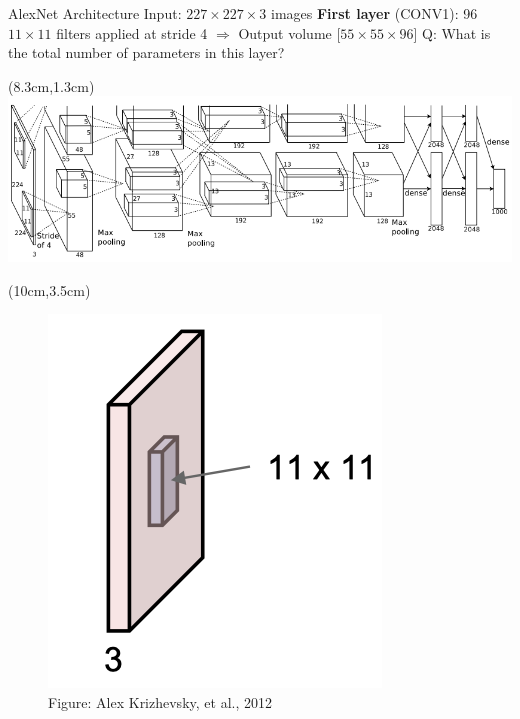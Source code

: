 \documentclass[serif, aspectratio=169]{beamer}
\begin{document}
\begin{frame}{AlexNet Architecture}
	\vspace{1cm}
	Input: $227 \times 227 \times 3$ images \vspace{0.3cm} \newline 
	\textbf{First layer} (CONV1): 96 $11 \times11$ filters applied at stride 4 \newline 
	$\Rightarrow$ Output volume [$55 \times 55 \times 96$] \newline
	\color{blue} Q: What is the total number of parameters in this layer?
	
	\begin{textblock*}{5cm}(8.3cm,1.3cm) %
	\includegraphics[keepaspectratio, scale=0.25]{pic/alexnet}
	\end{textblock*}
	
	\begin{textblock*}{6cm}(10cm,3.5cm) %
		\begin{figure}
			\centering
			\includegraphics[keepaspectratio, scale=0.25]{pic/cnn_layer2}
			\caption*{\scriptsize{Figure: Alex Krizhevsky, et al., 2012}}
		\end{figure}
	\end{textblock*}
\end{frame}
\end{document}
